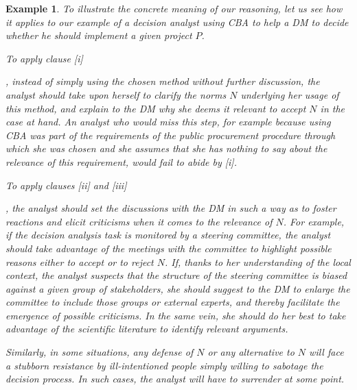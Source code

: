 \documentclass[preprint, french, english, 11pt, authoryear]{elsarticle}%
\newcommand{\ac}[1]{#1}
\newtheorem{example}{Example}
\begin{document}
\begin{example}
To illustrate the concrete meaning of our reasoning, let us see how it applies to our example of a decision analyst using \ac{CBA} to help a \ac{DM} to decide whether he should implement a given project $P$.

\begin{changebar}To apply clause [i]\end{changebar}, instead of simply using the chosen method without further discussion, the analyst should take upon herself to clarify the norms $N$ underlying her usage of this method, and explain to the \ac{DM} why she deems it relevant to accept $N$ in the case at hand.
An analyst who would miss this step, for example because using \ac{CBA} was part of the requirements of the public procurement procedure through which she was chosen and she assumes that she has nothing to say about the relevance of this requirement, would fail to abide by [i].
\begin{changebar}To apply clauses [ii] and [iii]\end{changebar}, the analyst should set the discussions with the \ac{DM} in such a way as to foster reactions and elicit criticisms when it comes to the relevance of $N$.
For example, if the decision analysis task is monitored by a steering committee, the analyst should take advantage of the meetings with the committee to highlight possible reasons either to accept or to reject $N$.
If, thanks to her understanding of the local context, the analyst suspects that the structure of the steering committee is biased against a given group of stakeholders, she should suggest to the \ac{DM} to enlarge the committee to include those groups or external experts, 
and thereby facilitate the emergence of possible criticisms.
In the same vein, she should do her best to take advantage of the scientific literature to identify relevant arguments.  

Similarly, in some situations, any defense of $N$ or any alternative to $N$ will face a stubborn resistance by ill-intentioned people simply willing to sabotage the decision process. In such cases, the analyst will have to surrender at some point.



\end{example}
\end{document}
